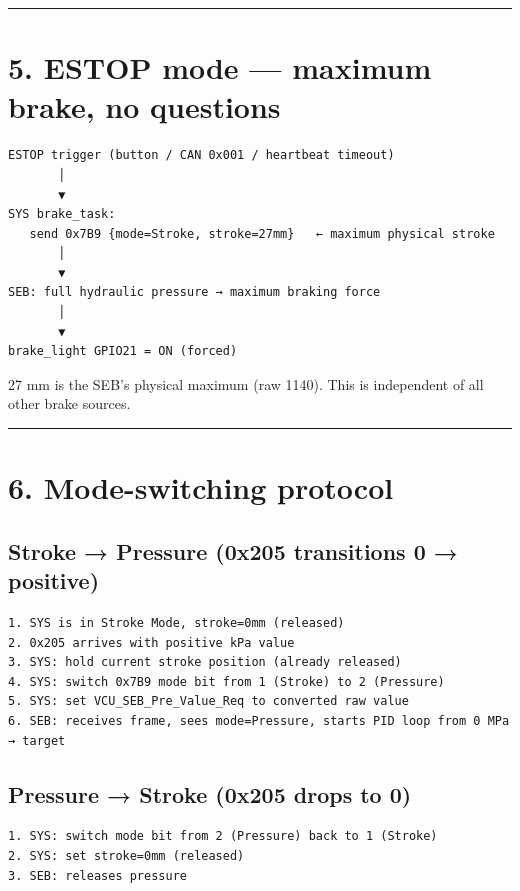 \documentclass[12pt,a4paper,oneside]{report}
\begin{document}
\begin{center}\rule{0.5\linewidth}{0.5pt}\end{center}

\section{5. ESTOP mode --- maximum brake, no
questions}\label{estop-mode-maximum-brake-no-questions}

\begin{verbatim}
ESTOP trigger (button / CAN 0x001 / heartbeat timeout)
       │
       ▼
SYS brake_task:
   send 0x7B9 {mode=Stroke, stroke=27mm}   ← maximum physical stroke
       │
       ▼
SEB: full hydraulic pressure → maximum braking force
       │
       ▼
brake_light GPIO21 = ON (forced)
\end{verbatim}

27 mm is the SEB's physical maximum (raw 1140). This is independent of all other
brake sources.

\begin{center}\rule{0.5\linewidth}{0.5pt}\end{center}

\section{6. Mode-switching protocol}\label{mode-switching-protocol}

\subsection{Stroke → Pressure (0x205 transitions 0 →
positive)}\label{stroke-pressure-0x205-transitions-0-positive}

\begin{verbatim}
1. SYS is in Stroke Mode, stroke=0mm (released)
2. 0x205 arrives with positive kPa value
3. SYS: hold current stroke position (already released)
4. SYS: switch 0x7B9 mode bit from 1 (Stroke) to 2 (Pressure)
5. SYS: set VCU_SEB_Pre_Value_Req to converted raw value
6. SEB: receives frame, sees mode=Pressure, starts PID loop from 0 MPa → target
\end{verbatim}

\subsection{Pressure → Stroke (0x205 drops to
0)}\label{pressure-stroke-0x205-drops-to-0}

\begin{verbatim}
1. SYS: switch mode bit from 2 (Pressure) back to 1 (Stroke)
2. SYS: set stroke=0mm (released)
3. SEB: releases pressure
\end{verbatim}
\end{document}
